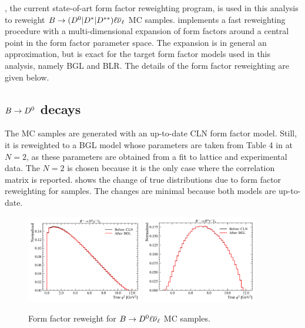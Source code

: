 \Hammer, the current state-of-art form factor reweighting program, is used
in this analysis to reweight
$B \rightarrow ({{D}^0}| {{D}^*}| D^{**}) {\ell}{{\overline{\nu}}_\ell}$ MC samples.
\Hammer implements a fast reweighting procedure with a multi-dimensional
expansion of form factors around a central point in the form factor parameter
space.
The expansion is in general an approximation, but is exact for the target form
factor models used in this analysis, namely BGL and BLR.
The details of the form factor reweighting are given below.

\subsection{$B \rightarrow {\ensuremath{{D}^0}}$ decays}

The \Dz MC samples are generated with an up-to-date CLN form factor model.
Still, it is reweighted to a BGL model whose parameters are taken
from Table 4 in \cite{Bigi_2016} at $N = 2$, as these
parameters are obtained from a fit to lattice and experimental data.
The $N = 2$ is chosen because it is the only case where the correlation matrix
is reported.
 shows the change of true \qSq distributions due to form factor
reweighting for \Dz samples.
The changes are minimal because both models are up-to-date.

\begin{figure}[htb]
    \centering
    \includegraphics[width=0.45\textwidth]{
        ./figs-mc-correction/reweighting-form-factors/norm/D0Mu.pdf
    }
    \includegraphics[width=0.45\textwidth]{
        ./figs-mc-correction/reweighting-form-factors/sig/D0Tau.pdf
    }
    \caption{
        Form factor reweight for $B \rightarrow {\ensuremath{{D}^0}} {\ensuremath{\ell}}{\ensuremath{{\overline{\nu}}_\ell}}$ MC samples.
    }
    \label{fig:ff-d0}
\end{figure}


